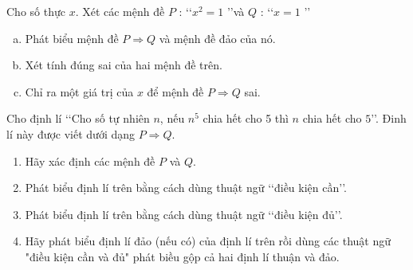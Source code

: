 \begin{bt}%
	Cho số thực $x$. Xét các mệnh đề $P$ : \lq\lq $x^2=1$ \rq\rq và  $Q$ : \lq\lq $x=1$ \rq\rq
	\begin{enumerate}[a.]
		 \item Phát biểu mệnh đề $P\Rightarrow Q$ và mệnh đề đảo của nó.
		\item Xét tính đúng sai của hai mệnh đề trên. 
		\item Chỉ  ra một giá trị của $x$ để mệnh đề $P\Rightarrow Q$ sai.
	\end{enumerate}
\end{bt}

\begin{bt}%
	Cho định lí \lq\lq Cho  số tự nhiên $n$, nếu $n^{5}$ chia hết cho 5 thì $n$ chia hết cho $5$\rq\rq. Đinh lí này được viết dưới dạng $P \Rightarrow Q$.
	\begin{enumerate}
		\item  Hãy xác định các mệnh đề $P$ và $Q$.
		\item Phát biểu định lí trên bằng cách dùng thuật ngữ \lq\lq điều kiện  cần\rq\rq.
		\item Phát biểu định lí trên bằng cách dùng thuật ngữ  \lq\lq điều kiện đủ\rq\rq.
		\item Hãy phát biểu định lí đảo (nếu có) của định lí trên rồi dùng các thuật ngữ "điều kiện cần và đủ" phát  biều gộp cả hai định lí thuận và đảo.
	\end{enumerate}
\end{bt}

